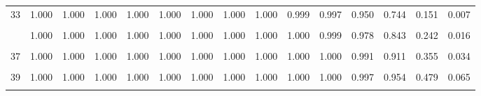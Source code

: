 \documentclass[
]{article}
\begin{document}
\begin{table}[!h]
{\begin{tabular}[t]{ccccccccccccccc}
33 & 1.000 & 1.000 & 1.000 & 1.000 & 1.000 & 1.000 & 1.000 & 1.000 & 0.999 & 0.997 & 0.950 & 0.744 & 0.151 & 0.007\\
\cellcolor{gray!10}{34} & \cellcolor{gray!10}{1.000} & \cellcolor{gray!10}{1.000} & \cellcolor{gray!10}{1.000} & \cellcolor{gray!10}{1.000} & \cellcolor{gray!10}{1.000} & \cellcolor{gray!10}{1.000} & \cellcolor{gray!10}{1.000} & \cellcolor{gray!10}{1.000} & \cellcolor{gray!10}{0.999} & \cellcolor{gray!10}{0.999} & \cellcolor{gray!10}{0.966} & \cellcolor{gray!10}{0.797} & \cellcolor{gray!10}{0.194} & \cellcolor{gray!10}{0.011}\\
\addlinespace
35 & 1.000 & 1.000 & 1.000 & 1.000 & 1.000 & 1.000 & 1.000 & 1.000 & 1.000 & 0.999 & 0.978 & 0.843 & 0.242 & 0.016\\
\cellcolor{gray!10}{36} & \cellcolor{gray!10}{1.000} & \cellcolor{gray!10}{1.000} & \cellcolor{gray!10}{1.000} & \cellcolor{gray!10}{1.000} & \cellcolor{gray!10}{1.000} & \cellcolor{gray!10}{1.000} & \cellcolor{gray!10}{1.000} & \cellcolor{gray!10}{1.000} & \cellcolor{gray!10}{1.000} & \cellcolor{gray!10}{1.000} & \cellcolor{gray!10}{0.985} & \cellcolor{gray!10}{0.880} & \cellcolor{gray!10}{0.296} & \cellcolor{gray!10}{0.024}\\
37 & 1.000 & 1.000 & 1.000 & 1.000 & 1.000 & 1.000 & 1.000 & 1.000 & 1.000 & 1.000 & 0.991 & 0.911 & 0.355 & 0.034\\
\cellcolor{gray!10}{38} & \cellcolor{gray!10}{1.000} & \cellcolor{gray!10}{1.000} & \cellcolor{gray!10}{1.000} & \cellcolor{gray!10}{1.000} & \cellcolor{gray!10}{1.000} & \cellcolor{gray!10}{1.000} & \cellcolor{gray!10}{1.000} & \cellcolor{gray!10}{1.000} & \cellcolor{gray!10}{1.000} & \cellcolor{gray!10}{1.000} & \cellcolor{gray!10}{0.994} & \cellcolor{gray!10}{0.935} & \cellcolor{gray!10}{0.416} & \cellcolor{gray!10}{0.047}\\
39 & 1.000 & 1.000 & 1.000 & 1.000 & 1.000 & 1.000 & 1.000 & 1.000 & 1.000 & 1.000 & 0.997 & 0.954 & 0.479 & 0.065\\
\addlinespace
\cellcolor{gray!10}{40} & \cellcolor{gray!10}{1.000} & \cellcolor{gray!10}{1.000} & \cellcolor{gray!10}{1.000} & \cellcolor{gray!10}{1.000} & \cellcolor{gray!10}{1.000} & \cellcolor{gray!10}{1.000} & \cellcolor{gray!10}{1.000} & \cellcolor{gray!10}{1.000} & \cellcolor{gray!10}{1.000} & \cellcolor{gray!10}{1.000} & \cellcolor{gray!10}{0.998} & \cellcolor{gray!10}{0.968} & \cellcolor{gray!10}{0.542} & \cellcolor{gray!10}{0.086}\\
\bottomrule
\end{tabular}}
\end{table}
\end{document}
